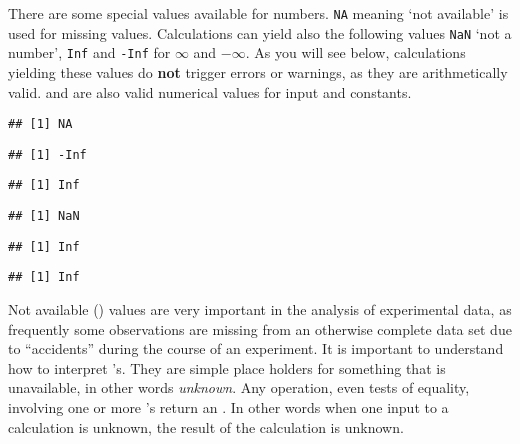 \documentclass[paper=a4,10pt,div=17,headsepline,BCOR=12mm,twoside,open=right]{scrbook}\usepackage{knitr}
\begin{document}
There are some special values available for numbers. \texttt{NA} meaning `not available' is used for missing values. Calculations can yield also the following values \texttt{NaN} `not a number', \texttt{Inf} and \texttt{-Inf} for $\infty$ and $-\infty$. As you will see below, calculations yielding these values do \textbf{not} trigger errors or warnings, as they are arithmetically valid.  and  are also valid numerical values for input and constants.

\begin{knitrout}\footnotesize
{}\color{fgcolor}\begin{kframe}
\begin{alltt}
 \hlkwb{<-} 
\end{alltt}
\begin{verbatim}
## [1] NA
\end{verbatim}
\begin{alltt}
\hlopt{-} \hlopt{/} 
\end{alltt}
\begin{verbatim}
## [1] -Inf
\end{verbatim}
\begin{alltt}
 \hlopt{/} 
\end{alltt}
\begin{verbatim}
## [1] Inf
\end{verbatim}
\begin{alltt}
 \hlopt{/} 
\end{alltt}
\begin{verbatim}
## [1] NaN
\end{verbatim}
\begin{alltt}
 \hlopt{+} 
\end{alltt}
\begin{verbatim}
## [1] Inf
\end{verbatim}
\begin{alltt}
 \hlkwb{<-} \hlopt{-}
 \hlopt{* -}
\end{alltt}
\begin{verbatim}
## [1] Inf
\end{verbatim}
\end{kframe}
\end{knitrout}

Not available () values are very important in the analysis of experimental data, as frequently some observations are missing from an otherwise complete data set due to ``accidents'' during the course of an experiment. It is important to understand how to interpret 's. They are simple place holders for something that is unavailable, in other words \emph{unknown}. Any operation, even tests of equality, involving one or more 's return an . In other words when one input to a calculation is unknown, the result of the calculation is unknown.
\end{document}
